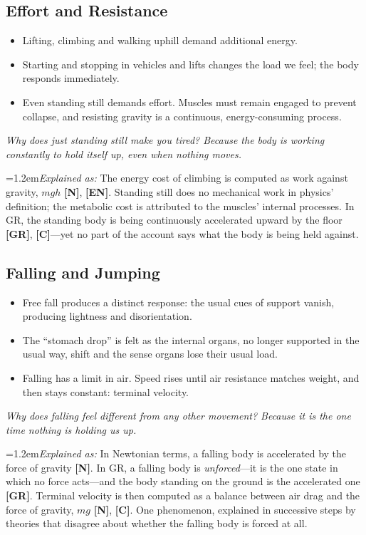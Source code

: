 \documentclass[11pt,a4paper]{article}
\newcommand{\reg}[1]{\textsf{\small\textbf{[#1]}}}
\newcommand{\RN}{\reg{N}}
\newcommand{\RGR}{\reg{GR}}
\newcommand{\RC}{\reg{C}}
\newcommand{\REN}{\reg{EN}}
\newcommand{\expl}[1]{\par\begingroup\leftskip=1.2em\small\noindent\textit{Explained as:} #1\par\endgroup\smallskip}%
\newcommand{\why}[1]{\par\textit{#1}\par}
\begin{document}
\subsection{Effort and Resistance}

\begin{itemize}
  \item Lifting, climbing and walking uphill demand additional energy.
  \item Starting and stopping in vehicles and lifts changes the load we feel; the body responds immediately.
  \item Even standing still demands effort. Muscles must remain engaged to prevent collapse, and resisting gravity is a continuous, energy-consuming process.
\end{itemize}

\why{Why does just standing still make you tired? Because the body is working constantly to hold itself up, even when nothing moves.}

\expl{The energy cost of climbing is computed as work against gravity, $mgh$ \RN{}, \REN{}. Standing still does no mechanical work in physics' definition; the metabolic cost is attributed to the muscles' internal processes. In GR, the standing body is being continuously accelerated upward by the floor \RGR{}, \RC{}---yet no part of the account says what the body is being held against.}

\subsection{Falling and Jumping}

\begin{itemize}
  \item Free fall produces a distinct response: the usual cues of support vanish, producing lightness and disorientation.
  \item The ``stomach drop'' is felt as the internal organs, no longer supported in the usual way, shift and the sense organs lose their usual load.
  \item Falling has a limit in air. Speed rises until air resistance matches weight, and then stays constant: terminal velocity.
\end{itemize}

\why{Why does falling feel different from any other movement? Because it is the one time nothing is holding us up.}

\expl{In Newtonian terms, a falling body is accelerated by the force of gravity \RN{}. In GR, a falling body is \emph{unforced}---it is the one state in which no force acts---and the body standing on the ground is the accelerated one \RGR{}. Terminal velocity is then computed as a balance between air drag and the force of gravity, $mg$ \RN{}, \RC{}. One phenomenon, explained in successive steps by theories that disagree about whether the falling body is forced at all.}
\end{document}
